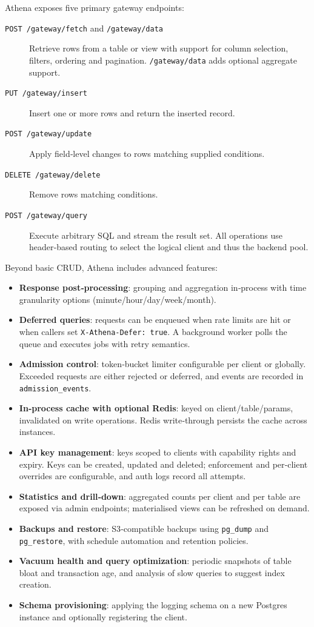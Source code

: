 \documentclass[11pt,a4paper]{article}
\begin{document}
Athena exposes five primary gateway endpoints:
\begin{description}
  \item[\texttt{POST /gateway/fetch} and \texttt{/gateway/data}] Retrieve rows from a table or view with support for column selection, filters, ordering and pagination.  \texttt{/gateway/data} adds optional aggregate support.
  \item[\texttt{PUT /gateway/insert}] Insert one or more rows and return the inserted record.
  \item[\texttt{POST /gateway/update}] Apply field‑level changes to rows matching supplied conditions.
  \item[\texttt{DELETE /gateway/delete}] Remove rows matching conditions.
  \item[\texttt{POST /gateway/query}] Execute arbitrary SQL and stream the result set.  All operations use header‑based routing to select the logical client and thus the backend pool.
\end{description}

Beyond basic CRUD, Athena includes advanced features:
\begin{itemize}
  \item \textbf{Response post‑processing}: grouping and aggregation in‑process with time granularity options (minute/hour/day/week/month).
  \item \textbf{Deferred queries}: requests can be enqueued when rate limits are hit or when callers set \texttt{X‑Athena‑Defer: true}.  A background worker polls the queue and executes jobs with retry semantics.
  \item \textbf{Admission control}: token‑bucket limiter configurable per client or globally.  Exceeded requests are either rejected or deferred, and events are recorded in \texttt{admission\_events}.
  \item \textbf{In‑process cache with optional Redis}: keyed on client/table/params, invalidated on write operations.  Redis write‑through persists the cache across instances.
  \item \textbf{API key management}: keys scoped to clients with capability rights and expiry.  Keys can be created, updated and deleted; enforcement and per‑client overrides are configurable, and auth logs record all attempts.
  \item \textbf{Statistics and drill‑down}: aggregated counts per client and per table are exposed via admin endpoints; materialised views can be refreshed on demand.
  \item \textbf{Backups and restore}: S3‑compatible backups using \texttt{pg\_dump} and \texttt{pg\_restore}, with schedule automation and retention policies.
  \item \textbf{Vacuum health and query optimization}: periodic snapshots of table bloat and transaction age, and analysis of slow queries to suggest index creation.
  \item \textbf{Schema provisioning}: applying the logging schema on a new Postgres instance and optionally registering the client.
\end{itemize}
\end{document}
